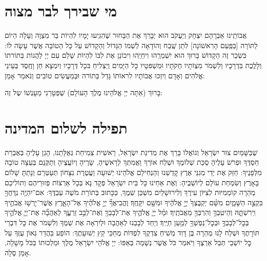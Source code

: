 \documentclass[a4paper, twoside, openany, parskip=half, 10pt]{article}
\begin{document}
\section*{מי שבירך לבר מצוה}
\vspace{-.5\baselineskip}
\begin{multicols}{2}
אֲבוֹתֵֽינוּ אַבְרָהָם יִצְחָק וְיַעֲקֹב הוּא יְבָרֵךְ אֶת הַבָּחוּר
 שֶׁהִגִֽיעוּ יָמָיו לִהְיוֹת בַּר מִצְוָה וְעָלָה הַיוֹם לַתּוֹרָה [בַּפַּֽעַם הָרִאשׁוֹנָה] לִתֵן שֶֽׁבַח וְהוֹדָאָה לְשְׁמוֹ הַגָּדוֹל וְהַקָדוֹשׁ עַל כָּל הַטוֹבָה אֲשֶׁר עָשָׂה לוֹ: בִּשְׂכַר זֶה הַקָדוֹשׁ בָּרוּךְ הוּא יִשְׁמְרֵֽהוּ וִיחַיֵֽהוּ וִיכוֹנֵן אֶת לִבּוֹ לִהְיוֹת שָׁלֵם עִם יְיָ לַהֲגוֹת בּֽתוֹרתוֹ וְלָלֶֽכֶת בִּדְרָכָיו וְלִשְׁמֹר מִצְוֹתָיו חֻקּׂתָיו וּמִשְׁפּטָיו כָּל הַיָּמִים
 וְיַצְלִיחַ בּכָל דְּרָכָיו וְיִמְצָא חֵן וָחֶֽסֶד בְּעֵינֵי אֱלֹהִים וְאָדָם וְיִזְכּוּ אֲבוֹתָיו לִראוֹתוֹ גָּדֵל בַּתוֹרה וּּבְמַעֲשִׂים טוֹבִים
  וְנֹאמַר אָמֵן:
\end{multicols}


בָּרוּךְ (אַתָּה יְיָ אֱלֹהֵינוּ מֶלֶךְ הָעוֹלָם) שֶׁפְּטָרַנִי מֵעָנְשׁוֹ שֶל זֶה:\\

 
\section*{תפילה לשלום המדינה}
\vspace{-.5\baselineskip}
\begin{multicols}{2}
 שֶׁבַּשָּׁמַיִם צוּר יִשְׂרָאֵל וְגוֹאֲלוֹ בָּרֵךְ אֶת מְדִינַת יִשְׂרָאֵל, רֵאשִׁית צְמִיחַת גְּאֻלָּתֵנוּ, הָגֵן עָלֶיהָ בְּאֶבְרַת חַסְדֶּךָ וּפְרֹשׂ עָלֶיהָ סֻכַּת שְׁלוֹמֶךָ וּשְׁלַח אוֹרְךָ וַאֲמִתְּךָ לְרָאשֶׁיהָ, שָׂרֶיהָ וְיוֹעֲצֶיהָ וְתַקְּנֵם בְּעֵצָה טוֹבָה מִלְּפָנֶיךָ: חַזֵּק אֶת יְדֵי מְגִנֵּי אֶרֶץ קׇדְשֵׁנוּ וְהַנְחִילֵם אֱלֹהֵינוּ יְשׁוּעָה וַעֲטֶרֶת נִצָּחוֹן תְּעַטְּרֵם וְנָתַתָּ שָׁלוֹם בָּאָרֶץ וְשִׂמְחַת עוֹלָם לְיוֹשְׁבֶיהָ:
וְאֶת אַחֵינוּ כָּל בֵּית יִשְׂרָאֵל פְּקׇד נָא בְּכָל אַרְצוֹת פְּזוּרֵיהֶם וְתוֹלִיכֵם מְהֵרָה קוֹמְמִיּוּת לְצִיּוֹן עִירֶךָ וְלִירוּשָׁלַיִם מִשְׁכַּן שְׁמֶךָ, כַּכָּתוּב בְּתוֹרַת מֹשֶׁה עַבְדֶּךָ:
אִם־יִהְיֶ֥ה נִֽדַּחֲךָ֖ בִּקְצֵ֣ה הַשָּׁמָ֑יִם מִשָּׁ֗ם יְקַבֶּצְךָ֙ יְיָ֣ אֱלֹהֶ֔יךָ וּמִשָּׁ֖ם יִקָּחֶֽךָ׃
וֶהֱבִיאֲךָ֞ יְיָ֣ אֱלֹהֶ֗יךָ אֶל־הָאָ֛רֶץ אֲשֶׁר־יָרְשׁ֥וּ אֲבֹתֶ֖יךָ וִֽירִשְׁתָּ֑הּ וְהֵיטִֽבְךָ֥ וְהִרְבְּךָ֖ מֵאֲבֹתֶֽיךָ׃ 
 וּמָ֨ל יְיָ֧ אֱלֹהֶ֛יךָ אֶת־לְבָבְךָ֖ וְאֶת־לְבַ֣ב זַרְעֶ֑ךָ לְאַהֲבָ֞ה אֶת־יְיָ֧ אֱלֹהֶ֛יךָ בְּכׇל־לְבָבְךָ֥ וּבְכׇל־נַפְשְׁךָ֖ לְמַ֥עַן חַיֶּֽיךָ׃ 
וְיַחֵד לְבָבֵנוּ לְאַהֲבָה וּלְיִרְאָה אֶת שְׁמֶךָ וְלִשְׁמֹר אֶת כׇּל דִּבְרֵי תּוֹרָתֶךָ וּשְׁלַח לָנוּ מְהֵרָה בֶּן דָּוִד מְשִׁיחַ צִדְקֶךָ לִפְדּוֹת מְחַכֵּי קֵץ יְשׁוּעָתֶךָ: הוֹפַע בַּהֲדַר גְּאוֹן עֻזֶּךָ עַל כׇּל יוֹשְׁבֵי תֵּבֵל אַרְצֶךָ וְיֹאמַר כֹּל אֲשֶׁר נְשָׁמָה בְּאַפּוֹ:
יְיָ אֱלֹהֵי יִשְׂרָאֵל מֶלֶךְ וּמַלְכוּתוֹ בַּכֹּל מָשָׁלָה, אָמֵן סֶלָה. 
\end{multicols}
\end{document}
